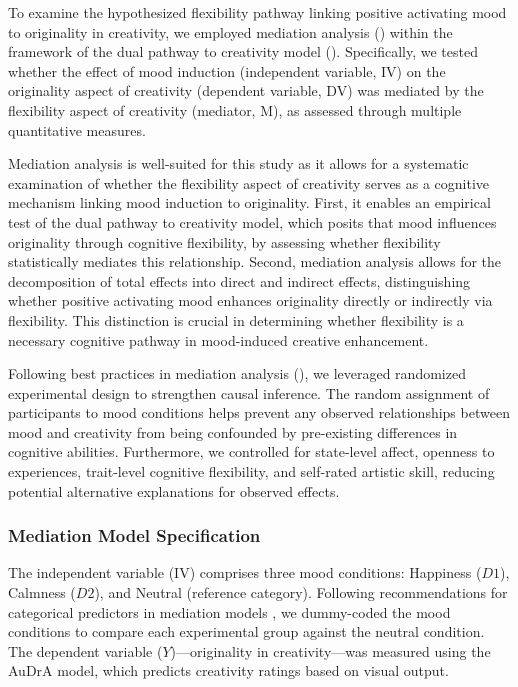 \documentclass[../MA_Thesis.tex]{subfiles}
\begin{document}
To examine the hypothesized flexibility pathway linking positive activating mood to originality in creativity, we employed mediation analysis (\cite{mackinnon_mediation_2007}) within the framework of the dual pathway to creativity model (\cite{de_dreu_hedonic_2008}). Specifically, we tested whether the effect of mood induction (independent variable, IV) on the originality aspect of creativity (dependent variable, DV) 
was mediated by the flexibility aspect of creativity (mediator, M), as assessed through multiple quantitative measures.

Mediation analysis is well-suited for this study as it allows for a systematic examination of whether the flexibility aspect of creativity serves as a cognitive mechanism linking mood induction to originality. First, it enables an empirical test of the dual pathway to creativity model, which posits that mood influences originality through cognitive flexibility, by assessing whether flexibility statistically mediates this relationship. Second, mediation analysis allows for the decomposition of total effects into direct and indirect effects, distinguishing whether positive activating mood enhances originality directly or indirectly via flexibility. This distinction is crucial in determining whether flexibility is a necessary cognitive pathway in mood-induced creative enhancement.

Following best practices in mediation analysis (\cite{homburg_mediation_2022}), we leveraged randomized experimental design to strengthen causal inference. The random assignment of participants to mood conditions helps prevent any observed relationships between mood and creativity from being confounded by pre-existing differences in cognitive abilities. Furthermore, we controlled for state-level affect, openness to experiences, trait-level cognitive flexibility, and self-rated artistic skill, reducing potential alternative explanations for observed effects.

\subsubsection*{Mediation Model Specification}
The independent variable (IV) comprises three mood conditions: Happiness (\(D1\)), Calmness (\(D2\)), and Neutral (reference category). Following recommendations for categorical predictors in mediation models \cite{hayes_statistical_2014}, we dummy-coded the mood conditions to compare each experimental group against the neutral condition. The dependent variable (\(Y\))—originality in creativity—was measured using the AuDrA model, which predicts creativity ratings based on visual output.
\end{document}

